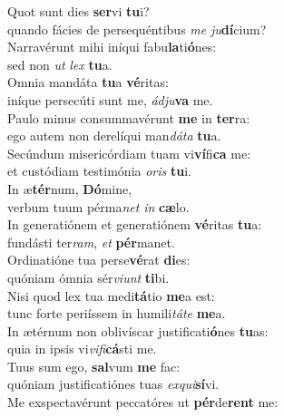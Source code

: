 \evenverse Quot sunt dies \textbf{ser}vi \textbf{tu}i?~\*\\
\evenverse quando fácies de persequéntibus \textit{me} \textit{ju}\textbf{dí}cium?\\
\oddverse Narravérunt mihi iníqui fabu\textbf{la}ti\textbf{ó}nes:~\*\\
\oddverse sed non \textit{ut} \textit{lex} \textbf{tu}a.\\
\evenverse Omnia mandáta \textbf{tu}a \textbf{vé}ritas:~\*\\
\evenverse iníque persecúti sunt me, \textit{ád}\textit{ju}\textbf{va} me.\\
\oddverse Paulo minus consummavérunt \textbf{me} in \textbf{ter}ra:~\*\\
\oddverse ego autem non derelíqui man\textit{dá}\textit{ta} \textbf{tu}a.\\
\evenverse Secúndum misericórdiam tuam vi\textbf{ví}fi\textbf{ca} me:~\*\\
\evenverse et custódiam testimónia \textit{o}\textit{ris} \textbf{tu}i.\\
\oddverse In æ\textbf{tér}num, \textbf{Dó}mine,~\*\\
\oddverse verbum tuum pérma\textit{net} \textit{in} \textbf{cæ}lo.\\
\evenverse In generatiónem et generatiónem \textbf{vé}ritas \textbf{tu}a:~\*\\
\evenverse fundásti ter\textit{ram}, \textit{et} \textbf{pér}manet.\\
\oddverse Ordinatióne tua perse\textbf{vé}rat \textbf{di}es:~\*\\
\oddverse quóniam ómnia sér\textit{vi}\textit{unt} \textbf{ti}bi.\\
\evenverse Nisi quod lex tua medi\textbf{tá}tio \textbf{me}a est:~\*\\
\evenverse tunc forte periíssem in humili\textit{tá}\textit{te} \textbf{me}a.\\
\oddverse In ætérnum non oblivíscar justificati\textbf{ó}nes \textbf{tu}as:~\*\\
\oddverse quia in ipsis vi\textit{vi}\textit{fi}\textbf{cá}sti me.\\
\evenverse Tuus sum ego, \textbf{sal}vum \textbf{me} fac:~\*\\
\evenverse quóniam justificatiónes tuas \textit{ex}\textit{qui}\textbf{sí}vi.\\
\oddverse Me exspectavérunt peccatóres ut \textbf{pér}de\textbf{rent} me:~\*\\
